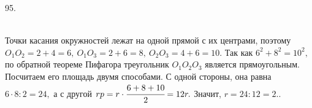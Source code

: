 \documentclass[12pt]{article}
\begin{document}
95. \begin{figure}[ht!]
\end{figure}\\
Точки касания окружностей лежат на одной прямой с их центрами, поэтому $O_1O_2=2+4=6,\ O_1O_3=2+6=8,\ O_2O_3=4+6=10.$ Так как $6^2+8^2=10^2,$ по обратной теореме Пифагора треугольник $O_1O_2O_3$ является прямоугольным. Посчитаем его площадь двумя способами. С одной стороны, она равна $6\cdot8:2=24,$ а с другой $rp=r\cdot\cfrac{6+8+10}{2}=12r.$ Значит, $r=24:12=2.$\newpage{}. \begin{figure}[ht!]
\end{figure}\\
\end{document}
